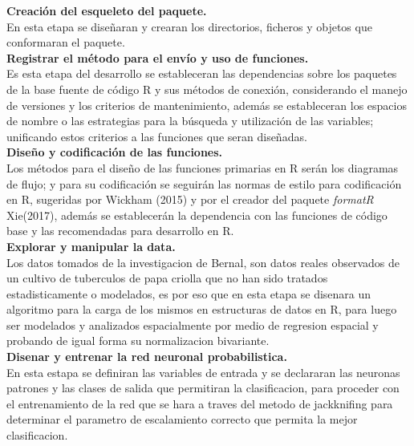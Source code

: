 \noindent
\textbf{Creación del esqueleto del paquete.}\\
En esta etapa se dise\~naran y crearan los directorios, ficheros y objetos que conformaran el paquete.\\

\noindent
\textbf{Registrar el m\'etodo para el env\'io y uso de funciones.}\\

Es esta etapa del desarrollo se estableceran las dependencias sobre los paquetes de la base fuente de código R y sus métodos de conexión, considerando el manejo de versiones y los criterios de mantenimiento, además  se estableceran  los espacios de nombre o las estrategias para la búsqueda y utilización de las variables; unificando estos criterios a las funciones que seran dise\~nadas.\\

\noindent
\textbf{Dise\~no y codificaci\'on de las funciones.}\\

Los m\'etodos para el dise\~no de las funciones primarias en R ser\'an los diagramas de flujo; y para su codificaci\'on se seguir\'an las normas de estilo para codificaci\'on en R, sugeridas por Wickham (2015) y por el creador del paquete \emph{formatR} Xie(2017), adem\'as se establecer\'an la dependencia con las funciones de c\'odigo base y las recomendadas para desarrollo en R.\\

\noindent
\textbf{Explorar y manipular la data.}\\

Los datos tomados de la investigacion de Bernal, son datos reales observados de un cultivo de tuberculos de papa criolla que no han sido tratados estadisticamente o modelados, es por eso que en esta etapa se disenara un algoritmo para la carga de los mismos en estructuras de datos en R, para luego ser modelados y analizados espacialmente por medio de regresion espacial y probando de igual forma su normalizacion bivariante.\\

\noindent
\textbf{Disenar y entrenar la red neuronal probabilistica.}\\

En esta estapa se definiran las variables de entrada y se declararan las neuronas patrones y las clases de salida que permitiran la clasificacion, para proceder con el entrenamiento de la red que se hara a traves del metodo de jackknifing para determinar el parametro de escalamiento correcto que permita la mejor clasificacion.\\

